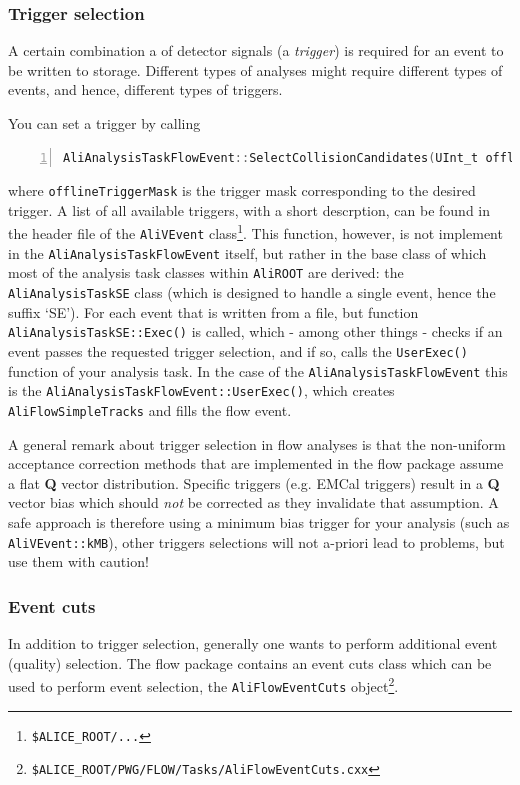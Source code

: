 \documentclass[a4paper]{book}
\numberwithin{equation}{subsection}
\begin{document}
\subsubsection{Trigger selection}
A certain combination a of detector signals (a \emph{trigger}) is required for an event to be written to storage. Different types of analyses might require different types of events, and hence, different types of triggers. 

You can set a trigger by calling
\begin{lstlisting}[language=C, numbers=left]
AliAnalysisTaskFlowEvent::SelectCollisionCandidates(UInt_t offlineTriggerMask);\end{lstlisting}
where \texttt{offlineTriggerMask} is the trigger mask corresponding to the desired trigger. A list of all available triggers, with a short descrption, can be found in the header file of the \texttt{AliVEvent} class\footnote{\texttt{\$ALICE\_ROOT/...}}. This function, however, is not implement in the \texttt{AliAnalysisTaskFlowEvent} itself, but rather in the base class of which most of the analysis task classes within \texttt{AliROOT} are derived: the \texttt{AliAnalysisTaskSE} class (which is designed to handle a single event, hence the suffix `SE'). For each event that is written from a file, but function \texttt{AliAnalysisTaskSE::Exec()} is called, which - among other things - checks if an event passes the requested trigger selection, and if so, calls the \texttt{UserExec()} function of your analysis task. In the case of the \texttt{AliAnalysisTaskFlowEvent} this is the \texttt{AliAnalysisTaskFlowEvent::UserExec()}, which creates \texttt{AliFlowSimpleTracks} and fills the flow event. 

A general remark about trigger selection in flow analyses is that the non-uniform acceptance correction methods that are implemented in the flow package assume a flat \textbf{Q} vector distribution. Specific triggers (e.g. EMCal triggers) result in a \textbf{Q} vector bias which should \emph{not} be corrected as they invalidate that assumption. A safe approach is therefore using a minimum bias trigger for your analysis (such as \texttt{AliVEvent::kMB}), other triggers selections will not a-priori lead to problems, but use them with caution!

\subsubsection{Event cuts}
In addition to trigger selection, generally one wants to perform additional event (quality) selection. The flow package contains an event cuts class which can be used to perform event selection, the \texttt{AliFlowEventCuts} object\footnote{\texttt{\$ALICE\_ROOT/PWG/FLOW/Tasks/AliFlowEventCuts.cxx}}. 
\end{document}
